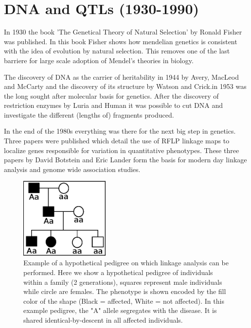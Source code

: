 \section{DNA and QTLs (1930-1990)}
In 1930 the book 'The Genetical Theory of Natural Selection' \cite{Fisher:1930} by Ronald 
Fisher was published. In this book Fisher shows how mendelian genetics is consistent with 
the idea of evolution by natural selection. This removes one of the last barriere for large 
scale adoption of Mendel's theories in biology.

The discovery of DNA as the carrier of heritability in 1944 by Avery, MacLeod and McCarty 
\cite{Avery:1944} and the discovery of its structure by Watson and Crick.in 1953 
\cite{Watson:1953} was the long sought after molecular basis for genetics. After the 
discovery of restriction enzymes by Luria and Human \cite{Luria:1952} it was possible 
to cut DNA and investigate the different (lengths of) fragments produced.

In the end of the 1980s everything was there for the next big step in genetics. Three 
papers were published which detail the use of RFLP linkage maps to localize genes 
responsible for variation in quantitative phenotypes. These three papers by David Botstein 
and Eric Lander \cite{Lander:1986, Lander:1987, Lander:1989} form the basis for modern 
day linkage analysis and genome wide association studies. 

\begin{figure}[h!]
 \centering
    \includegraphics[width=0.4\textwidth]{eps/image_1_2}
  \caption[Example of pedigree based linkage analysis.]
    {Example of a hypothetical pedigree on which linkage analysis can be performed. Here we show a 
    hypothetical pedigree of individuals within a family (2 generations), squares represent 
    male individuals while circle are females. The phenotype is shown encoded by the fill 
    color of the shape (Black = affected, White = not affected).  In this example pedigree, 
    the "A" allele segregates with the disease. It is shared identical-by-descent in all 
    affected individuals. }
    \label{fig:pedigree}
\end{figure}

